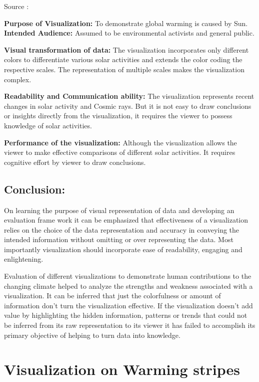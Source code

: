 \documentclass[]{book}
\begin{document}
Source :\citep{ClimateMyth}

\textbf{Purpose of Visualization:} To demonstrate global warming is caused by Sun.
\textbf{Intended Audience:} Assumed to be environmental activists and general public.

\textbf{Visual transformation of data:} The visualization incorporates only different colors to differentiate various solar activities and extends the color coding the respective scales. The representation of multiple scales makes the visualization complex.

\textbf{Readability and Communication ability:} The visualization represents recent changes in solar activity and Cosmic rays. But it is not easy to draw conclusions or insights directly from the visualization, it requires the viewer to possess knowledge of solar activities.

\textbf{Performance of the visualization:} Although the visualization allows the viewer to make effective comparisons of different solar activities. It requires cognitive effort by viewer to draw conclusions.

\hypertarget{conclusion}{%
\section{Conclusion:}\label{conclusion}}

On learning the purpose of visual representation of data and developing an evaluation frame work it can be emphasized that effectiveness of a visualization relies on the choice of the data representation and accuracy in conveying the intended information without omitting or over representing the data. Most importantly visualization should incorporate ease of readability, engaging and enlightening.

Evaluation of different visualizations to demonstrate human contributions to the changing climate helped to analyze the strengths and weakness associated with a visualization. It can be inferred that just the colorfulness or amount of information don't turn the visualization effective. If the visualization doesn't add value by highlighting the hidden information, patterns or trends that could not be inferred from its raw representation to its viewer it has failed to accomplish its primary objective of helping to turn data into knowledge.

\hypertarget{visualization-on-warming-stripes}{%
\chapter{Visualization on Warming stripes}\label{visualization-on-warming-stripes}}
\end{document}

